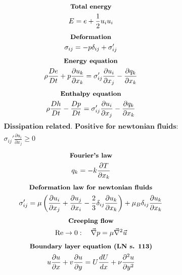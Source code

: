 \documentclass[10pt, a4paper]{article}
\newcommand{\derivative}[2]{\frac{\partial #1}{\partial #2}}
\begin{document}
\begin{multicols*}{2}
    \begin{gather*}
        \textbf{\small Total energy} \\
        E = e + \frac12 u_i u_i
    \end{gather*}
    \begin{gather*}
        \textbf{\small Deformation} \\
        \sigma_{ij} = -p \delta_{ij} + \sigma_{ij}'
    \end{gather*}
    \begin{gather*}
        \textbf{\small Energy equation} \\
        \rho \frac{De}{Dt} + p\derivative{ u_k}{x_k} =
        \sigma_{ij}' \derivative{ u_i}{x_j}  - \derivative{ q_k}{x_k}
    \end{gather*}
    \begin{gather*}
        \textbf{\small Enthalpy equation} \\
        \rho \frac{Dh}{Dt} - \frac{Dp}{Dt} =
        \sigma_{ij}' \derivative{ u_i}{x_j}  - \derivative{ q_k}{x_k}
    \end{gather*}
    \begin{gather*}
        \textbf{Dissipation related. Positive for newtonian fluids:} \\
        \sigma_{ij}' \derivative{ u_i}{x_j} \geq 0
    \end{gather*}
    \begin{gather*}
        \textbf{\small Fourier's law} \\
        q_k = -k\derivative{ T}{x_k}
    \end{gather*}
    \begin{gather*}
        \textbf{\small Deformation law for newtonian fluids} \\
        \sigma_{ij}' = \mu \left( \derivative{ u_i}{x_j} + \derivative{ u_j}{x_i}
        - \frac23\delta_{ij}\derivative{ u_k}{x_k} \right) + \mu_B\delta_{ij}\derivative{ u_k}{x_k}
    \end{gather*}
    \begin{gather*}
        \textbf{\small Creeping flow} \\
        \text{Re} \rightarrow 0: \quad \vec{\nabla}p = \mu \vec{\nabla}^2 \vec{u}
    \end{gather*}
    \begin{gather*}
        \textbf{\small Boundary layer equation (LN s. 113)} \\
        u\derivative{ u}{x} + v \derivative{ u}{y} =
        U \frac{dU}{dx} + \nu \derivative{^2 u}{y^2}
    \end{gather*}

\end{multicols*}
\end{document}
